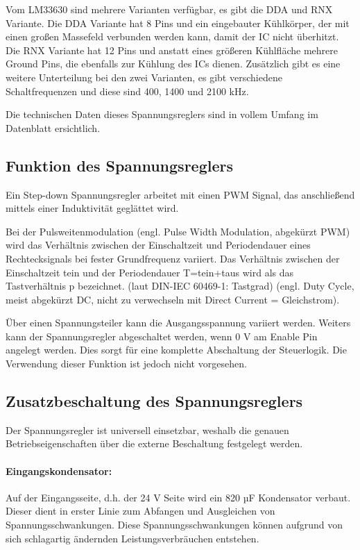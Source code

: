 Vom LM33630 sind mehrere Varianten verfügbar, es gibt die DDA und RNX Variante.
Die DDA Variante hat 8 Pins und ein eingebauter Kühlkörper, der mit einen großen Massefeld verbunden werden kann, damit der IC nicht überhitzt.
Die RNX Variante hat 12 Pins und anstatt eines größeren Kühlfläche mehrere Ground Pins, die ebenfalls zur Kühlung des ICs dienen.
Zusätzlich gibt es eine weitere Unterteilung bei den zwei Varianten, es gibt verschiedene Schaltfrequenzen und diese sind 400, 1400 und 2100 kHz.\par
Die technischen Daten dieses Spannungsreglers sind in vollem Umfang im Datenblatt ersichtlich. \cite[vgl.][]{lmr33630-datasheet}

\subsection{Funktion des Spannungsreglers}
Ein Step-down Spannungsregler arbeitet mit einen PWM Signal, das anschließend mittels einer Induktivität geglättet wird.\par
Bei der Pulsweitenmodulation (engl. Pulse Width Modulation, abgekürzt PWM) wird das Verhältnis zwischen der Einschaltzeit und Periodendauer eines Rechtecksignals bei fester Grundfrequenz variiert. Das Verhältnis zwischen der Einschaltzeit tein und der Periodendauer T=tein+taus wird als das Tastverhältnis p bezeichnet. (laut DIN-IEC 60469-1: Tastgrad) (engl. Duty Cycle, meist abgekürzt DC, nicht zu verwechseln mit Direct Current = Gleichstrom). \cite[Einleitung]{mikrocontroller-spannungsregler}\par

Über einen Spannungsteiler kann die Ausgangsspannung variiert werden.
Weiters kann der Spannungsregler abgeschaltet werden, wenn 0 V am Enable Pin angelegt werden.
Dies sorgt für eine komplette Abschaltung der Steuerlogik.
Die Verwendung dieser Funktion ist jedoch nicht vorgesehen.

\subsection{Zusatzbeschaltung des Spannungsreglers}
Der Spannungsregler ist universell einsetzbar, weshalb die genauen Betriebseigenschaften über die externe Beschaltung festgelegt werden.
\paragraph{Eingangskondensator:}
Auf der Eingangsseite, d.h. der 24 V Seite wird ein 820 µF Kondensator verbaut.
Dieser dient in erster Linie zum Abfangen und Ausgleichen von Spannungsschwankungen.
Diese Spannungsschwankungen können aufgrund von sich schlagartig ändernden Leistungsverbräuchen entstehen.

